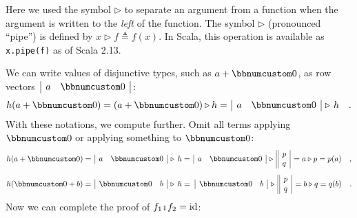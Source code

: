 Here we used the symbol $\triangleright$ to separate an argument
from a function when the argument is written to the \emph{left} of
the function. The symbol $\triangleright$ (pronounced \textsf{``}pipe\textsf{''})
is defined by $x\triangleright f\triangleq f(x)$. In Scala, this
operation is available as \lstinline!x.pipe(f)! as of Scala 2.13.

We can write values of disjunctive types, such as $a+\bbnum 0$, as
row vectors $\,\begin{array}{|cc|}
a & \bbnum 0\end{array}\,$:
\begin{equation}
h(a+\bbnum 0)=(a+\bbnum 0)\triangleright h=\,\begin{array}{|cc|}
a & \bbnum 0\end{array}\,\triangleright\,h\quad.\label{eq:forward-notation-}
\end{equation}
With these notations, we compute further. Omit all terms applying
$\bbnum 0$ or applying something to $\bbnum 0$:
\[
h(a+\bbnum 0)=\,\begin{array}{|cc|}
a & \bbnum 0\end{array}\,\triangleright\,h=\,\begin{array}{|cc|}
a & \bbnum 0\end{array}\,\triangleright\,\begin{array}{||c|}
p\\
q
\end{array}\,=a\triangleright p=p(a)\quad,
\]
\[
h(\bbnum 0+b)=\,\begin{array}{|cc|}
\bbnum 0 & b\end{array}\,\triangleright\,h=\,\,\begin{array}{|cc|}
\bbnum 0 & b\end{array}\,\triangleright\,\begin{array}{||c|}
p\\
q
\end{array}\,=b\triangleright q=q(b)\quad.
\]
Now we can complete the proof of $f_{1}\bef f_{2}=\text{id}$:
